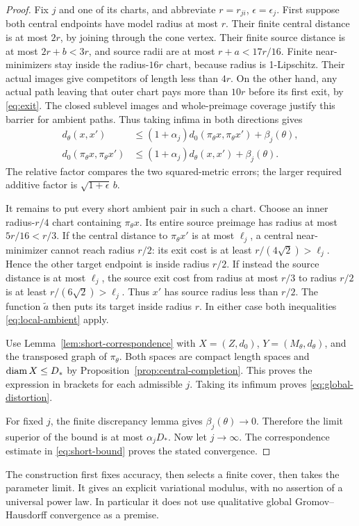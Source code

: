 \begin{proof}
Fix \(j\) and one of its charts, and abbreviate \(r=r_{ji}\),
\(\epsilon=\epsilon_j\). First suppose both central endpoints have
model radius at most \(r\). Their finite central distance is at
most \(2r\), by joining through the cone vertex. Their finite
source distance is at most \(2r+b<3r\), and source radii are
at most \(r+a<17r/16\).
Finite near-minimizers stay inside the radius-\(16r\) chart,
because radius is 1-Lipschitz. Their actual images give competitors
of length less than \(4r\). On the other hand, any actual path
leaving that outer chart pays more than \(10r\) before its first
exit, by \eqref{eq:exit}. The closed sublevel images and
whole-preimage coverage justify this barrier for ambient paths.
Thus taking infima in both directions gives
\begin{equation}\label{eq:local-ambient}
 \begin{aligned}
 d_\theta(x,x')&\le(1+\alpha_j)d_0(\pi_\theta x,\pi_\theta x')
                         +\beta_j(\theta),\\
 d_0(\pi_\theta x,\pi_\theta x')
              &\le(1+\alpha_j)d_\theta(x,x')+\beta_j(\theta).
 \end{aligned}
\end{equation}
The relative factor compares the two squared-metric errors;
the larger required additive factor is \(\sqrt{1+\epsilon}\,b\).

It remains to put every short ambient pair in such a chart.
Choose an inner radius-\(r/4\) chart containing \(\pi_\theta x\).
Its entire source preimage has radius at most \(5r/16<r/3\).
If the central distance to \(\pi_\theta x'\) is at most \(\ell_j\),
a central near-minimizer cannot reach radius \(r/2\): its exit
cost is at least \(r/(4\sqrt2)>\ell_j\).
Hence the other target endpoint is inside radius \(r/2\).
If instead the source distance is at most \(\ell_j\), the source
exit cost from radius at most \(r/3\) to radius \(r/2\) is at least
\(r/(6\sqrt2)>\ell_j\). Thus \(x'\) has source radius less than
\(r/2\). The function \(\widetilde a\) then puts its target
inside radius \(r\). In either case both inequalities
\eqref{eq:local-ambient} apply.

Use Lemma~\ref{lem:short-correspondence} with
\(X=(Z,d_0)\), \(Y=(M_\theta,d_\theta)\), and the transposed
graph of \(\pi_\theta\). Both spaces are compact length spaces
and \(\operatorname{diam} X\le D_*\) by
Proposition~\ref{prop:central-completion}.
This proves the expression in brackets for each admissible \(j\).
Taking its infimum proves \eqref{eq:global-distortion}.

For fixed \(j\), the finite discrepancy lemma gives
\(\beta_j(\theta)\to0\). Therefore the limit superior of the
bound is at most \(\alpha_jD_*\). Now let \(j\to\infty\).
The correspondence estimate in \eqref{eq:short-bound} proves
the stated convergence.
\end{proof}

The construction first fixes accuracy, then selects a finite
cover, then takes the parameter limit. It gives an explicit
variational modulus, with no assertion of a universal power law.
In particular it does not use qualitative global
Gromov--Hausdorff convergence as a premise.
